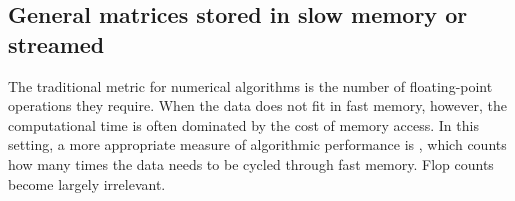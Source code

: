 \documentclass[final]{siamltex}
\newcounter{algorithm}[section]
\newtheorem{remark}{Remark}[section]
\begin{document}



\subsection{General matrices stored in slow memory or streamed}
\label{sec:outofcore}

The traditional metric for numerical algorithms is the number
of floating-point operations they require.  When the data does
not fit in fast memory, however, the computational time is
often dominated by the cost of memory access.  In this setting,
a more appropriate measure of algorithmic performance is
, which counts how many times the data
needs to be cycled through fast memory.  Flop counts become
largely irrelevant.
\end{document}
